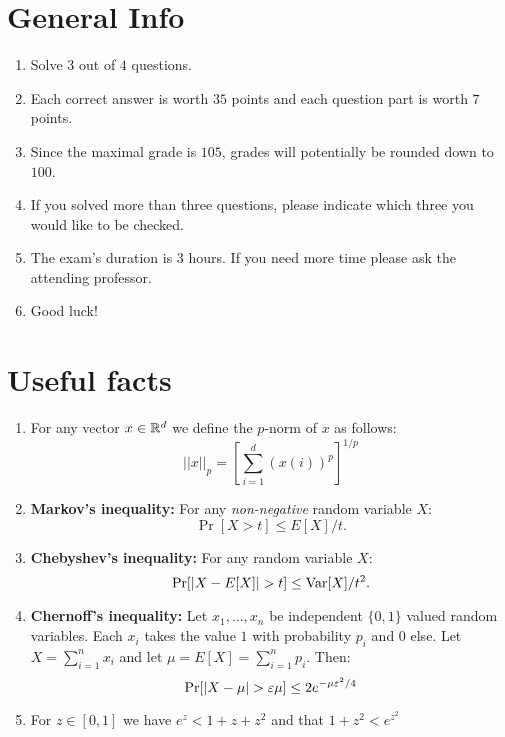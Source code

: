 \documentclass{article}
\begin{document}


\section*{General Info}
\begin{enumerate}
\item Solve $3$ out of $4$ questions.
\item Each correct answer is worth $35$ points and each question part is worth $7$ points.
\item Since the maximal grade is $105$, grades will potentially be rounded down to $100$.
\item If you solved more than three questions, please indicate which three you would like to be checked.
\item The exam's duration is 3 hours. If you need more time please ask the attending professor.
\item Good luck!
\end{enumerate}


\section*{Useful facts}
\begin{enumerate}
\item For any vector $x \in {\mathbb{R}}^{d}$ we define the $p$-norm of $x$ as
follows:
\[
||x||_p = [\sum_{i=1}^{d}(x(i))^p]^{1/p}
\]

\item {\bf Markov's inequality:} For any {\it non-negative} random variable
$X$:
\[
\Pr[X > t] \le E[X]/t.
\]
\item {\bf Chebyshev's inequality:} For any random variable $X$:
\[
\Pr[|X - E[X]| > t] \le {\operatorname{Var}}[X]/t^2.
\]
\item {\bf Chernoff's inequality:} Let $x_1,\ldots,x_n$ be independent
$\{0,1\}$ valued random variables. Each $x_i$ takes the value $1$
with probability $p_i$ and $0$ else. Let $X = \sum_{i=1}^{n}x_i$ and
let $\mu = E[X] = \sum_{i=1}^{n}p_i$. Then:
\[
\Pr[|X - \mu| > \varepsilon\mu] \le 2e^{-\mu \varepsilon^2/4}
\]

\item For $z \in [0,1]$ we have $e^z < 1 + z + z^2$ and that $1+z^2 < e^{z^2}$




\end{enumerate}
\end{document}
